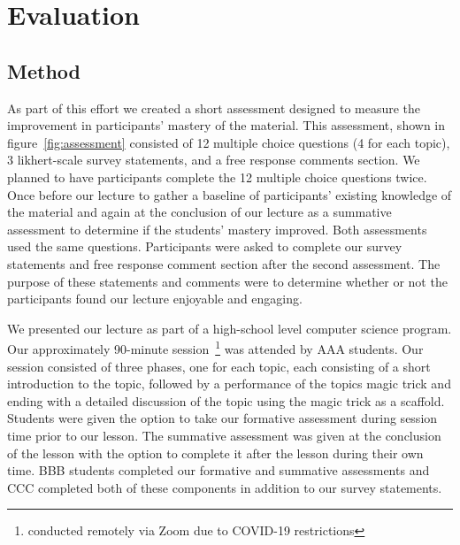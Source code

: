 \section{Evaluation}
\label{SEC:evaluation}

\subsection{Method}
As part of this effort we created a short assessment
designed to measure the improvement in participants' mastery of the material.
This assessment, shown in figure~\ref{fig:assessment}
consisted of 12 multiple choice questions (4 for each topic),
3 likhert-scale survey statements,
and a free response comments section.
We planned to have participants complete the 12 multiple choice questions twice.
Once before our lecture to gather a baseline of
participants' existing knowledge of the material and again at the conclusion of our
lecture as a summative assessment to determine if the students' mastery
improved.  Both assessments used the same questions.
Participants were asked to complete our survey statements and
free response comment section after the second assessment.  The purpose of
these statements and comments were to determine whether or not the
participants found our lecture enjoyable and engaging.

We presented our lecture as part of a high-school level computer science
program.
Our approximately 90-minute session~\footnote{conducted remotely
via Zoom due to COVID-19 restrictions} was attended by AAA students.
Our session consisted of three phases, one for each topic, each consisting
of a short introduction to the topic,
followed by a performance of the topics magic trick
and ending with a detailed discussion of the topic
using the magic trick as a scaffold.
Students were given the option to take our formative assessment
during session time prior to our lesson.
The summative assessment was given at the conclusion of the lesson
with the option to complete it after the lesson during their own time.
BBB students completed our formative and summative assessments and CCC
completed both of these components in addition to our survey statements.


